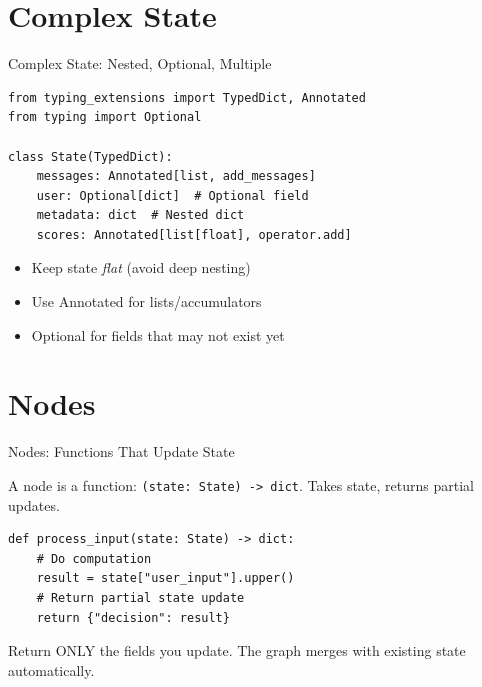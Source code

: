 \documentclass[aspectratio=169,11pt]{beamer}
\begin{document}
\section{Complex State}
\begin{frame}[fragile,t,shrink=3]{Complex State: Nested, Optional, Multiple}
\vspace{0.02cm}

\begin{codebox}
\begin{lstlisting}
from typing_extensions import TypedDict, Annotated
from typing import Optional

class State(TypedDict):
    messages: Annotated[list, add_messages]
    user: Optional[dict]  # Optional field
    metadata: dict  # Nested dict
    scores: Annotated[list[float], operator.add]
\end{lstlisting}
\end{codebox}

\vspace{0.1cm}

\begin{tipbox}[Guidelines]
\setlength{\itemsep}{1pt}
\begin{itemize}
  \item Keep state \textit{flat} (avoid deep nesting)
  \item Use Annotated for lists/accumulators
  \item Optional for fields that may not exist yet
\end{itemize}
\end{tipbox}
\end{frame}

\section{Nodes}
\begin{frame}[fragile,t]{Nodes: Functions That Update State}
\vspace{0.1cm}

\begin{conceptbox}
A node is a function: \texttt{(state: State) -> dict}. Takes state, returns partial updates.
\end{conceptbox}

\vspace{0.1cm}

\begin{codebox}
\begin{lstlisting}
def process_input(state: State) -> dict:
    # Do computation
    result = state["user_input"].upper()
    # Return partial state update
    return {"decision": result}
\end{lstlisting}
\end{codebox}

\vspace{0.1cm}

\begin{warningbox}
Return ONLY the fields you update. The graph merges with existing state automatically.
\end{warningbox}
\end{frame}
\end{document}
